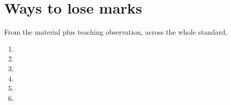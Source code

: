 \documentclass[11pt]{article}
\begin{document}
\section{Ways to lose marks}\label{lose}
From the material plus teaching observation, across the whole standard.
\begin{enumerate}[leftmargin=7mm, itemsep=2pt]
\item[\textbf{\lmnum{nocalc}}] 
\item[\textbf{\lmnum{wrongfn}}] 
\item[\textbf{\lmnum{incomplete}}] 
\item[\textbf{\lmnum{nojust}}] 
\item[\textbf{\lmnum{plusc}}] 
\item[\textbf{\lmnum{context}}] 
\end{enumerate}
\end{document}
